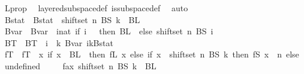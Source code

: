 \begin{isabellebody}
\ L{\isacharunderscore}{\kern0pt}prop\ \isamarkupfalse%
\ layered{\isacharunderscore}{\kern0pt}subspace{\isacharunderscore}{\kern0pt}def\ is{\isacharunderscore}{\kern0pt}subspace{\isacharunderscore}{\kern0pt}def\ \isamarkupfalse%
\ auto\isanewline
\isanewline
\ \ \ \ \isamarkupfalse%
\ Bstat\ \ {\isachardoublequoteopen}Bstat\ {\isasymequiv}\ shiftset\ n\ {\isacharparenleft}{\kern0pt}BS\ k{\isacharparenright}{\kern0pt}\ {\isasymunion}\ BL\ {}{\isachardoublequoteclose}\isanewline
\ \ \ \ \isamarkupfalse%
\ Bvar\ \ {\isachardoublequoteopen}Bvar\ {\isasymequiv}\ {\isacharparenleft}{\kern0pt}{\isasymlambda}i{\isacharcolon}{\kern0pt}{\isacharcolon}{\kern0pt}nat{\isachardot}{\kern0pt}\ {\isacharparenleft}{\kern0pt}if\ i\ {\isacharequal}{\kern0pt}\ {}\ then\ BL\ {}\ else\ shiftset\ n\ {\isacharparenleft}{\kern0pt}BS\ {\isacharparenleft}{\kern0pt}i\ {\isacharminus}{\kern0pt}\ {}{\isacharparenright}{\kern0pt}{\isacharparenright}{\kern0pt}{\isacharparenright}{\kern0pt}{\isacharparenright}{\kern0pt}{\isachardoublequoteclose}\isanewline
\ \ \ \ \isamarkupfalse%
\ BT\ \ {\isachardoublequoteopen}BT\ {\isasymequiv}\ {\isacharparenleft}{\kern0pt}{\isasymlambda}i\ {\isasymin}\ {\isacharbraceleft}{\kern0pt}{\isachardot}{\kern0pt}{\isachardot}{\kern0pt}{\isacharless}{\kern0pt}k{\isacharplus}{\kern0pt}{}{\isacharbraceright}{\kern0pt}{\isachardot}{\kern0pt}\ Bvar\ i{\isacharparenright}{\kern0pt}{\isacharparenleft}{\kern0pt}{\isacharparenleft}{\kern0pt}k{\isacharplus}{\kern0pt}{}{\isacharparenright}{\kern0pt}{\isacharcolon}{\kern0pt}{\isacharequal}{\kern0pt}Bstat{\isacharparenright}{\kern0pt}{\isachardoublequoteclose}\isanewline
\ \ \ \ \isamarkupfalse%
\ fT\ \ {\isachardoublequoteopen}fT\ {\isasymequiv}\ {\isacharparenleft}{\kern0pt}{\isasymlambda}x{\isachardot}{\kern0pt}\ {\isacharparenleft}{\kern0pt}if\ x\ {\isasymin}\ BL\ {}\ then\ fL\ x\ else\ {\isacharparenleft}{\kern0pt}if\ x\ {\isasymin}\ shiftset\ n\ {\isacharparenleft}{\kern0pt}BS\ k{\isacharparenright}{\kern0pt}\ then\ fS\ {\isacharparenleft}{\kern0pt}x\ {\isacharminus}{\kern0pt}\ n{\isacharparenright}{\kern0pt}\ else\ undefined{\isacharparenright}{\kern0pt}{\isacharparenright}{\kern0pt}{\isacharparenright}{\kern0pt}{\isachardoublequoteclose}\isanewline
\isanewline
\isanewline
\isanewline
\ \ \ \isamarkupfalse%
\ fax{}{\isacharcolon}{\kern0pt}\ {\isachardoublequoteopen}shiftset\ n\ {\isacharparenleft}{\kern0pt}BS\ k{\isacharparenright}{\kern0pt}\ {\isasyminter}\ BL\ {}\ {\isacharequal}{\kern0pt}\ {\isacharbraceleft}{\kern0pt}{\isacharbraceright}{\kern0pt}{\isachardoublequoteclose}\ \ \isamarkupfalse%

\end{isabellebody}
